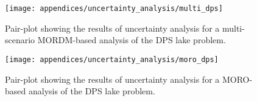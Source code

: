 \begin{figure}[H]
    \centering
    
    \texttt{[image: appendices/uncertainty\_analysis/multi\_dps]}
    \caption[DPS + multi-scenario MORDM pair plot]{Pair-plot showing the results of uncertainty analysis for a multi-scenario MORDM-based analysis of the DPS lake problem.}
    \label{fig:pairplot-multi-dps}
\end{figure}

\begin{figure}[H]
    \centering
    
    \texttt{[image: appendices/uncertainty\_analysis/moro\_dps]}
    \caption[DPS + MORO pair plot]{Pair-plot showing the results of uncertainty analysis for a MORO-based analysis of the DPS lake problem.}
    \label{fig:pairplot-moro-dps}
\end{figure}